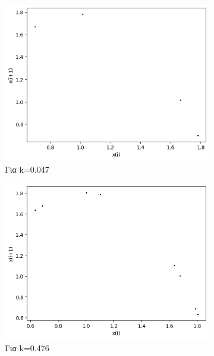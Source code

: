 \begin{figure}[h!]
\begin{subfigure}[b]{0.4\textwidth}
		\includegraphics[width=\textwidth]{LateX images/graphs/k047}
		\caption{Για k=0.047}
		\label{f:k3}
	\end{subfigure}
	\hfill
	\begin{subfigure}[b]{0.4\textwidth}
		\centering
		\includegraphics[width=\textwidth]{LateX images/graphs/k0476}
		\caption{Για k=0.476}
		\label{f:k4}
	\end{subfigure}
	\hfill
	\begin{subfigure}[b]{0.4\textwidth}
		\centering

\end{subfigure}
\end{figure}
